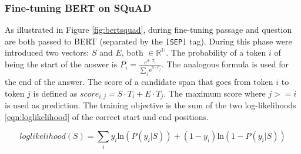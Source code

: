 \subsubsection{Fine-tuning BERT on SQuAD}
As illustrated in Figure \ref{fig:bertsquad}, during fine-tuning passage and question are both passed to BERT (separated by the \texttt{[SEP]} tag). During this phase were introduced two vectors: $S$ and $E$, both $\in \mathbb{R}^\mathbb{H}$. The probability of a token $i$ of being the start of the answer is $P_{i} = \frac{\mathrm{e}^{S \cdot T_{i}}}{\sum_{j} \mathrm{e}^{S \cdot T_{j}}}$. The analogous formula is used for the end of the answer. The score of a candidate span that goes from token $i$ to token $j$ is defined as $score_{i, j} = S \cdot T_{i} + E \cdot T_{j}$. The maximum score where $j >= i$ is used as prediction. The training objective is the sum of the two log-likelihoods \eqref{eqn:loglikelihood} of the correct start and end positions. 

\begin{equation}
\label{eqn:loglikelihood}
loglikelihood(S) = \sum_{i} y_{i} \mathrm{ln} (P(y_{i} | S)) + (1 - y_{i}) \mathrm{ln} (1 - P(y_{i} | S))
\end{equation}
